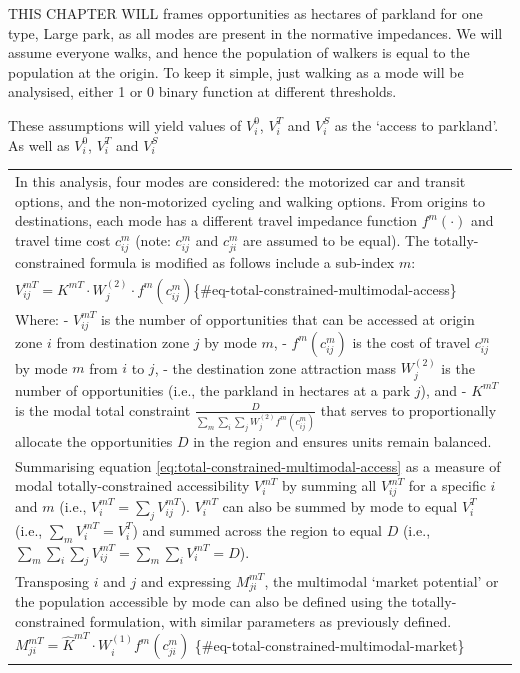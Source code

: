 \documentclass[
11pt, %
oneside, %
english, %
singlespacing, %
]{macthesis} %
\begin{document}
THIS CHAPTER WILL frames opportunities as hectares of parkland for one type, Large park, as all modes are present in the normative impedances. We will assume everyone walks, and hence the population of walkers is equal to the population at the origin. To keep it simple, just walking as a mode will be analysised, either 1 or 0 binary function at different thresholds.

These assumptions will yield values of \(V^0_i\), \(V^T_i\) and \(V^S_i\) as the `access to parkland'. As well as \(V^0_i\), \(V^T_i\) and \(V^S_i\)

\begin{longtable}[]{@{}
  >{\raggedleft\arraybackslash}p{}@{}}
\toprule\noalign{}
\endhead
\bottomrule\noalign{}
\endlastfoot
In this analysis, four modes are considered: the motorized car and transit options, and the non-motorized cycling and walking options. From origins to destinations, each mode has a different travel impedance function \(f^m(\cdot)\) and travel time cost \(c^m_{ij}\) (note: \(c^m_{ij}\) and \(c^m_{ji}\) are assumed to be equal). The totally-constrained formula is modified as follows include a sub-index \(m\): \\
\(
V^{mT}_{ij} = K^{mT} \cdot W_j^{(2)} \cdot f^m(c^m_{ij})
\)\{\#eq-total-constrained-multimodal-access\} \\
Where:
- \(V^{mT}_{ij}\) is the number of opportunities that can be accessed at origin zone \(i\) from destination zone \(j\) by mode \(m\),
- \(f^m(c^m_{ij})\) is the cost of travel \(c^m_{ij}\) by mode \(m\) from \(i\) to \(j\),
- the destination zone attraction mass \(W_j^{(2)}\) is the number of opportunities (i.e., the parkland in hectares at a park \(j\)), and
- \(K^{mT}\) is the modal total constraint \(\frac{D}{\sum_m\sum_i\sum_j W^{(2)}_jf^m(c^m_{ij})}\) that serves to proportionally allocate the opportunities \(D\) in the region and ensures units remain balanced. \\
Summarising equation \ref{eq:total-constrained-multimodal-access} as a measure of modal totally-constrained accessibility \(V^{mT}_i\) by summing all \(V^{mT}_{ij}\) for a specific \(i\) and \(m\) (i.e., \(V^{mT}_i = \sum_j V^{mT}_{ij}\)). \(V^{mT}_i\) can also be summed by mode to equal \(V^{T}_i\) (i.e., \(\sum_m V^{mT}_i = V^{T}_i\)) and summed across the region to equal \(D\) (i.e., \(\sum_m\sum_i\sum_j V^{mT}_{ij} = \sum_m\sum_i V^{mT}_{i} = D\)). \\
Transposing \(i\) and \(j\) and expressing \(M^{mT}_{ji}\), the multimodal `market potential' or the population accessible by mode can also be defined using the totally-constrained formulation, with similar parameters as previously defined.
\(
M^{mT}_{ji} = \hat K^{mT} \cdot W_i^{(1)} f^m(c^m_{ji})
\) \{\#eq-total-constrained-multimodal-market\} \\
\end{longtable}
\end{document}
